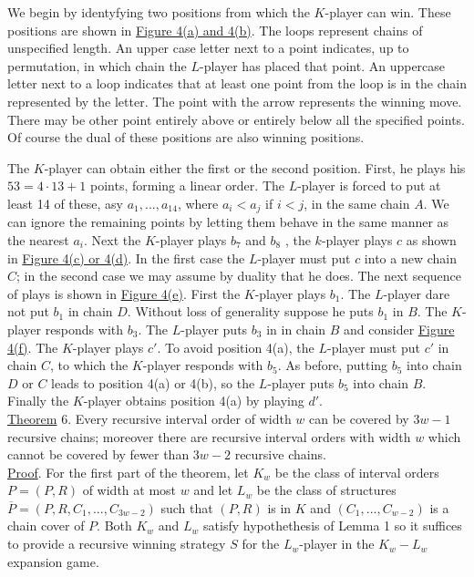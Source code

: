\documentclass[twoside]{article}
\begin{document}
We begin by identyfying two positions from which the $K$-player can win. These positions are shown in \underline{Figure 4(a) and 4(b)}. The loops
represent chains of unspecified length. An upper case letter next to a point indicates, up to permutation, in which chain the $L$-player has placed
that point. An uppercase letter next to a loop indicates that at least one point from the loop is in the chain represented by the letter. The point 
with the arrow represents the winning move. There may be other point entirely above or entirely below all the specified points. Of course the dual
of these positions are also winning positions.

The $K$-player can obtain either the first or the second position. First, he plays his $53 = 4 \cdot 13 + 1$ points, forming a linear order.
The $L$-player is forced to put at least 14 of these, asy $a_1,...,a_{14}$, where $a_i < a_j$ if $i<j$, in the same chain $A$. We can ignore the
remaining points by letting them behave in the same manner as the nearest $a_i$. Next the $K$-player plays $b_7$ and $b_8$ , the $k$-player plays
$c$ as shown in \underline{Figure 4(c) or 4(d)}. In the first case the $L$-player must put $c$ into a new chain $C$; in the second case
we may assume by duality that he does. The next sequence of plays is shown in \underline{Figure 4(e)}. First the $K$-player plays $b_1$. The
$L$-player dare not put $b_1$ in chain $D$. Without loss of generality suppose he puts $b_1$ in $B$. The $K$-player responds with $b_3$.
The $L$-player puts $b_3$ in in chain $B$ and consider \underline{Figure 4(f)}. The $K$-player plays $c'$. To avoid position 4(a), the $L$-player
must put $c'$ in chain $C$, to which the $K$-player responds with $b_5$. As before, putting $b_5$ into chain $D$ or $C$ leads to position 4(a) or
4(b), so the $L$-player puts $b_5$ into chain $B$. Finally the $K$-player obtains position 4(a) by playing $d'$.\\
%
%
\newline
\underline{Theorem} 6. \cite{KiersteadTrotter81} Every recursive interval order of width $w$ can be covered by $3w-1$ recursive chains;
moreover there are recursive interval orders with width $w$ which cannot be covered by fewer than $3w-2$ recursive chains.\\
\newline
\underline{Proof}. For the first part of the theorem, let $K_w$ be the class of interval orders $P = (P,R)$ of width at most $w$ and let $L_w$ 
be the class of structures $\overline{P}= (P,R, C_1,...,C_{3w-2})$ such that
$(P,R)$ is in $K$ and $(C_1,...,C_{w-2})$ is a chain cover of $P$. Both $K_w$ and $L_w$
satisfy hypothethesis of Lemma 1 so it suffices to provide a recursive winning strategy
$S$ for the $L_w$-player in the $K_w - L_w$ expansion game.
\end{document}
